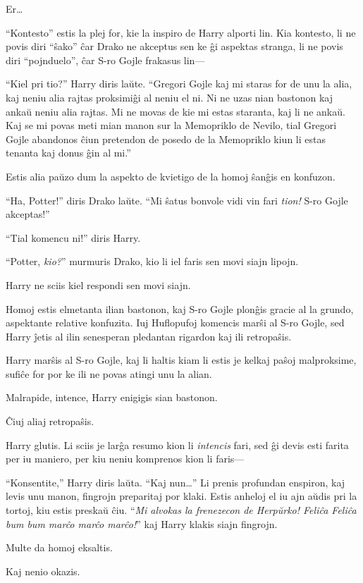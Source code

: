 Er\ldots

``Kontesto'' estis la plej for, kie la inspiro de Harry alporti
lin. Kia kontesto, li ne povis diri ``ŝako'' ĉar Drako ne akceptus sen
ke ĝi aspektas stranga, li ne povis diri ``pojnduelo'', ĉar S-ro Gojle
frakasus lin—

``Kiel pri tio?'' Harry diris laŭte. ``Gregori Gojle kaj mi staras
for de unu la alia, kaj neniu alia rajtas proksimiĝi al neniu el
ni. Ni ne uzas nian bastonon kaj ankaŭ neniu alia rajtas. Mi ne movas
de kie mi estas staranta, kaj li ne ankaŭ. Kaj se mi povas meti mian
manon sur la Memopriklo de Nevilo, tial Gregori Gojle abandonos ĉiun
pretendon de posedo de la Memopriklo kiun li estas tenanta kaj donus
ĝin al mi.''

Estis alia paŭzo dum la aspekto de kvietigo de la homoj ŝanĝis en konfuzon.

``Ha, Potter!'' diris Drako laŭte. ``Mi ŝatus bonvole vidi vin fari
\emph{tion!} S-ro Gojle akceptas!''


``Tial komencu ni!'' diris Harry.

``Potter, \emph{kio?}'' murmuris Drako, kio li iel faris sen movi siajn lipojn.

Harry ne sciis kiel respondi sen movi siajn.

Homoj estis elmetanta ilian bastonon, kaj S-ro Gojle plonĝis gracie al
la grundo, aspektante relative konfuzita. Iuj Huflopufoj komencis
marŝi al S-ro Gojle, sed Harry ĵetis al ilin senesperan pledantan
rigardon kaj ili retropaŝis.

Harry marŝis al S-ro Gojle, kaj li haltis kiam li estis je kelkaj
paŝoj malproksime, sufiĉe for por ke ili ne povas atingi unu la alian.

Malrapide, intence, Harry enigigis sian bastonon.

Ĉiuj aliaj retropaŝis.

Harry glutis. Li sciis je larĝa resumo kion li \emph{intencis} fari,
sed ĝi devis esti farita per iu maniero, per kiu neniu komprenos kion
li faris—

``Konsentite,'' Harry diris laŭta. ``Kaj nun\ldots'' Li prenis
profundan enspiron, kaj levis unu manon, fingrojn preparitaj por
klaki. Estis anheloj el iu ajn aŭdis pri la tortoj, kiu estis preskaŭ
ĉiu. ``\emph{Mi alvokas la frenezecon de Herpŭrko! Feliĉa Feliĉa bum bum
  marĉo marĉo marĉo!}'' kaj Harry klakis siajn fingrojn.

Multe da homoj eksaltis.

Kaj nenio okazis.

